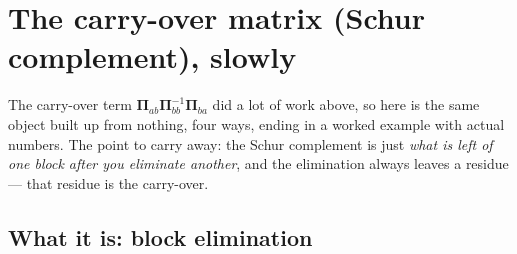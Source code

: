 \documentclass[11pt]{article}
\newcommand{\Prec}{\bm{\Pi}}        %
\theoremstyle{definition}
\begin{document}
\appendix
\section{The carry-over matrix (Schur complement), slowly}
\label{app:schur}

The carry-over term $\Prec_{ab}\Prec_{bb}^{-1}\Prec_{ba}$ did a lot of work
above, so here is the same object built up from nothing, four ways, ending
in a worked example with actual numbers. The point to carry away: the
Schur complement is just \emph{what is left of one block after you
eliminate another}, and the elimination always leaves a residue --- that
residue is the carry-over.

\subsection{What it is: block elimination}
\end{document}
